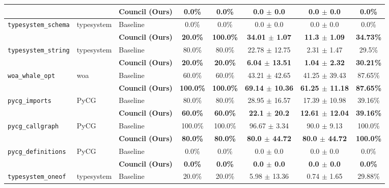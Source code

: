 \begin{table}[t]
\begin{tabular}{lll c c c c c}
 & & \textbf{Council (Ours)} & \textbf{0.0\%} & \textbf{0.0\%} & \textbf{0.0 $\pm$ 0.0} & \textbf{0.0 $\pm$ 0.0} & \textbf{0.0\%} \\
\midrule
\multirow{2}{*}{\texttt{typesystem_schema}} & \multirow{2}{*}{typesystem} & Baseline & 0.0\% & 0.0\% & 0.0 $\pm$ 0.0 & 0.0 $\pm$ 0.0 & 0.0\% \\
 & & \textbf{Council (Ours)} & \textbf{20.0\%} & \textbf{100.0\%} & \textbf{34.01 $\pm$ 1.07} & \textbf{11.3 $\pm$ 1.09} & \textbf{34.73\%} \\
\midrule
\multirow{2}{*}{\texttt{typesystem_string}} & \multirow{2}{*}{typesystem} & Baseline & 80.0\% & 80.0\% & 22.78 $\pm$ 12.75 & 2.31 $\pm$ 1.47 & 29.5\% \\
 & & \textbf{Council (Ours)} & \textbf{20.0\%} & \textbf{20.0\%} & \textbf{6.04 $\pm$ 13.51} & \textbf{1.04 $\pm$ 2.32} & \textbf{30.21\%} \\
\midrule
\multirow{2}{*}{\texttt{woa_whale_opt}} & \multirow{2}{*}{woa} & Baseline & 60.0\% & 60.0\% & 43.21 $\pm$ 42.65 & 41.25 $\pm$ 39.43 & 87.65\% \\
 & & \textbf{Council (Ours)} & \textbf{100.0\%} & \textbf{100.0\%} & \textbf{69.14 $\pm$ 10.36} & \textbf{61.25 $\pm$ 11.18} & \textbf{87.65\%} \\
\midrule
\multirow{2}{*}{\texttt{pycg_imports}} & \multirow{2}{*}{PyCG} & Baseline & 80.0\% & 80.0\% & 28.95 $\pm$ 16.57 & 17.39 $\pm$ 10.98 & 39.16\% \\
 & & \textbf{Council (Ours)} & \textbf{60.0\%} & \textbf{60.0\%} & \textbf{22.1 $\pm$ 20.2} & \textbf{12.61 $\pm$ 12.04} & \textbf{39.16\%} \\
\midrule
\multirow{2}{*}{\texttt{pycg_callgraph}} & \multirow{2}{*}{PyCG} & Baseline & 100.0\% & 100.0\% & 96.67 $\pm$ 3.34 & 90.0 $\pm$ 9.13 & 100.0\% \\
 & & \textbf{Council (Ours)} & \textbf{80.0\%} & \textbf{80.0\%} & \textbf{80.0 $\pm$ 44.72} & \textbf{80.0 $\pm$ 44.72} & \textbf{100.0\%} \\
\midrule
\multirow{2}{*}{\texttt{pycg_definitions}} & \multirow{2}{*}{PyCG} & Baseline & 0.0\% & 0.0\% & 0.0 $\pm$ 0.0 & 0.0 $\pm$ 0.0 & 0.0\% \\
 & & \textbf{Council (Ours)} & \textbf{0.0\%} & \textbf{0.0\%} & \textbf{0.0 $\pm$ 0.0} & \textbf{0.0 $\pm$ 0.0} & \textbf{0.0\%} \\
\midrule
\multirow{2}{*}{\texttt{typesystem_oneof}} & \multirow{2}{*}{typesystem} & Baseline & 20.0\% & 20.0\% & 5.98 $\pm$ 13.36 & 0.74 $\pm$ 1.65 & 29.88\% \\

\end{tabular}
\end{table}
